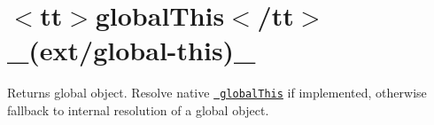 \chapter{\texorpdfstring{$<$}{<}tt\texorpdfstring{$>$}{>}global\+This\texorpdfstring{$<$}{<}/tt\texorpdfstring{$>$}{>} \+\_\+(ext/global-\/this)\+\_\+}
\hypertarget{md__2home_2solype_2delivery_2current__days_2Mannheim_2front_2node__modules_2ext_2docs_2global-this}{}\label{md__2home_2solype_2delivery_2current__days_2Mannheim_2front_2node__modules_2ext_2docs_2global-this}
\label{md__2home_2solype_2delivery_2current__days_2Mannheim_2front_2node__modules_2ext_2docs_2global-this_autotoc_md2569}%
%
 Returns global object. Resolve native \href{https://github.com/tc39/proposal-global}{\texttt{ global\+This}} if implemented, otherwise fallback to internal resolution of a global object.


\begin{DoxyCode}{0}
\DoxyCodeLine{}

\end{DoxyCode}
 